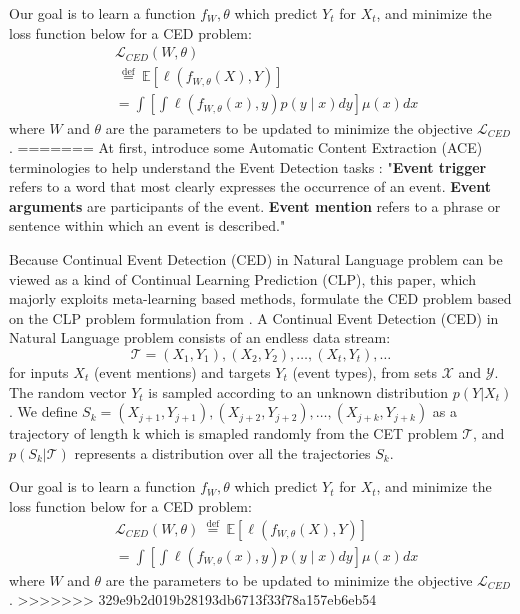 Our goal is to learn a function $f_W,\theta$ which predict $Y_t$ for $X_t$, and minimize the loss function below for a CED problem:
\begin{equation}
    \begin{split}
    &\mathcal{L}_{C E D}(W, \theta)  \\
    &\stackrel{\text { def }}{=}  \mathbb{E}\left[\ell\left(f_{W, \theta}(X), Y\right)\right] \\ 
    & =\int\left[\int \ell\left(f_{W, \theta}(x), y\right) p(y \mid x) d y\right] \mu(x) d x
    \end{split}
\end{equation}
where $W$ and $\theta$ are the parameters to be updated to minimize the objective $\mathcal{L}_{C E D}$.
=======
At first, introduce some Automatic Content Extraction (ACE) terminologies to help understand the Event Detection tasks \citep{cao2020incremental}: "\textbf{Event trigger} refers to a word that most clearly expresses the occurrence of an event. \textbf{Event arguments} are participants of the event. \textbf{Event mention} refers to a phrase or sentence within which an event is described."

Because Continual Event Detection (CED) in Natural Language problem can be viewed as a kind of Continual Learning Prediction (CLP), this paper, which majorly exploits meta-learning based methods, formulate the CED problem based on the CLP problem formulation from \citet{javed2019meta}.
A Continual Event Detection (CED) in Natural Language problem consists of an endless data stream:
\[\mathcal{T} = (X_1, Y_1), (X_2, Y_2), \dots, (X_t, Y_t), \dots\]
for inputs $X_t$ (event mentions) and targets $Y_t$ (event types), from sets $\mathcal{X}$ and $\mathcal{Y}$. The random vector $Y_t$ is sampled
according to an unknown distribution $p(Y|X_t)$. We define $S_k = (X_{j+1}, Y_{j+1}), (X_{j+2}, Y_{j+2}), \dots, (X_{j+k}, Y_{j+k})$ as a trajectory of length k which is smapled randomly from the CET problem $\mathcal{T}$, and $p(S_k|\mathcal{T})$ represents a distribution over all the trajectories $S_k$.

Our goal is to learn a function $f_W,\theta$ which predict $Y_t$ for $X_t$, and minimize the loss function below for a CED problem:
\begin{equation}
    \begin{split}
    &\mathcal{L}_{C E D}(W, \theta) \stackrel{\text { def }}{=}  \mathbb{E}\left[\ell\left(f_{W, \theta}(X), Y\right)\right] \\ 
    & =\int\left[\int \ell\left(f_{W, \theta}(x), y\right) p(y \mid x) d y\right] \mu(x) d x
    \end{split}
\end{equation}
where $W$ and $\theta$ are the parameters to be updated to minimize the objective $\mathcal{L}_{C E D}$.
>>>>>>> 329e9b2d019b28193db6713f33f78a157eb6eb54
